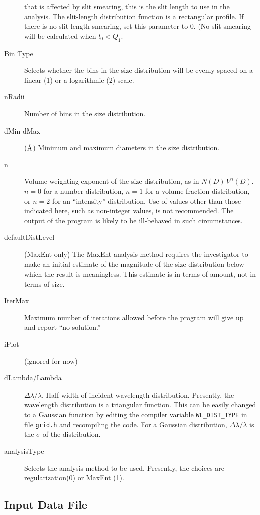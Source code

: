 \documentclass[letterpaper]{article}
\begin{document}
\begin{description}
   that is affected by slit smearing, this is the 
   slit length to use in the analysis.  The 
   slit-length distribution function is a rectangular 
   profile.  If there is no slit-length smearing, set 
   this parameter to 0.  (No slit-smearing will be 
   calculated when $l_0 < Q_1$.
  \item[Bin Type] Selects whether the bins in the 
   size distribution will be evenly spaced on a 
   linear (1) or a logarithmic (2) scale.
  \item[nRadii]  Number of bins in the size 
   distribution.
  \item[dMin dMax] ($\mbox\AA$) Minimum and maximum 
   diameters in the size distribution.
  \item[n] Volume weighting exponent of the size 
   distribution, as in $N(D) \, V^n(D)$.  
   $n=0$ for a number distribution,
   $n=1$ for a volume fraction distribution, or
   $n=2$ for an ``intensity'' distribution.
   Use of values other than those indicated here, 
   such as non-integer values, is not recommended.
   The output of the program is likely to be 
   ill-behaved in such circumstances.
  \item[defaultDistLevel] (MaxEnt only)  The MaxEnt 
   analysis method requires the investigator to make 
   an initial estimate of the magnitude of the size 
   distribution below which the result is 
   meaningless.  This estimate is in terms of amount,
   not in terms of size.
  \item[IterMax]  Maximum number of iterations 
   allowed before the program will give up and report 
   ``no solution.''
  \item[iPlot]  (ignored for now)
  \item[dLambda/Lambda]  $\Delta\lambda/\lambda$.  
   Half-width of incident wavelength distribution.
   Presently, the wavelength distribution is a 
   triangular function.  This can be easily changed 
   to a Gaussian function by editing the compiler 
   variable \texttt{WL\_DIST\_TYPE} in file 
   \texttt{grid.h} and recompiling the code.  For a 
   Gaussian distribution, $\Delta\lambda/\lambda$ is 
   the $\sigma$ of the distribution.
  \item[analysisType] Selects the analysis method to 
   be used.  Presently, the choices are regularization(0)
   or MaxEnt (1).
\end{description}


\subsection{Input Data File}
\end{document}
